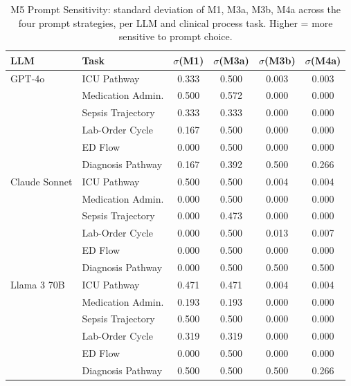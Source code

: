 \begin{table}[t]
  \caption{M5 Prompt Sensitivity: standard deviation of M1, M3a, M3b, M4a across the four prompt strategies, per LLM and clinical process task. Higher = more sensitive to prompt choice.}\label{tab:m5}
  \centering
  \begin{tabular}{@{}llcccc@{}}
    \toprule
    \textbf{LLM} & \textbf{Task} & \textbf{$\sigma$(M1)} & \textbf{$\sigma$(M3a)} & \textbf{$\sigma$(M3b)} & \textbf{$\sigma$(M4a)} \\
    \midrule
    GPT-4o & ICU Pathway & 0.333 & 0.500 & 0.003 & 0.003 \\
     & Medication Admin. & 0.500 & 0.572 & 0.000 & 0.000 \\
     & Sepsis Trajectory & 0.333 & 0.333 & 0.000 & 0.000 \\
     & Lab-Order Cycle & 0.167 & 0.500 & 0.000 & 0.000 \\
     & ED Flow & 0.000 & 0.500 & 0.000 & 0.000 \\
     & Diagnosis Pathway & 0.167 & 0.392 & 0.500 & 0.266 \\
    \midrule
    Claude Sonnet & ICU Pathway & 0.500 & 0.500 & 0.004 & 0.004 \\
     & Medication Admin. & 0.000 & 0.500 & 0.000 & 0.000 \\
     & Sepsis Trajectory & 0.000 & 0.473 & 0.000 & 0.000 \\
     & Lab-Order Cycle & 0.000 & 0.500 & 0.013 & 0.007 \\
     & ED Flow & 0.000 & 0.500 & 0.000 & 0.000 \\
     & Diagnosis Pathway & 0.000 & 0.500 & 0.500 & 0.500 \\
    \midrule
    Llama 3 70B & ICU Pathway & 0.471 & 0.471 & 0.004 & 0.004 \\
     & Medication Admin. & 0.193 & 0.193 & 0.000 & 0.000 \\
     & Sepsis Trajectory & 0.500 & 0.500 & 0.000 & 0.000 \\
     & Lab-Order Cycle & 0.319 & 0.319 & 0.000 & 0.000 \\
     & ED Flow & 0.000 & 0.500 & 0.000 & 0.000 \\
     & Diagnosis Pathway & 0.500 & 0.500 & 0.500 & 0.266 \\
    \midrule
    \bottomrule
  \end{tabular}
\end{table}

